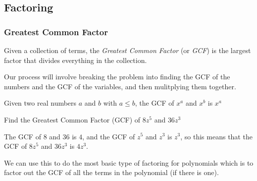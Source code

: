 \subsection{Factoring}

\subsubsection{Greatest Common Factor}

\begin{definition}\label{def: GCF}
Given a collection of terms, the \emph{Greatest Common Factor} (or \emph{GCF}) is the largest factor
that divides everything in the collection.
\end{definition}

Our process will involve breaking the problem into finding the GCF of the numbers and
the GCF of the variables, and then mulitplying them together.
\vspace{1em}

\begin{fact}
Given two real numbers $a$ and $b$ with $a\leq b$, the GCF of $x^a$ and $x^b$ is \ifprintanswers \underline{$x^a$}
\else \underline{\phantom{========}}\fi
\end{fact}

\ifprintanswers\else\newpage\fi

\begin{exercise}
Find the Greatest Common Factor (GCF) of $8z^5$ and $36z^3$
\end{exercise}
\begin{solution}[2in]
The GCF of $8$ and $36$ is \underline{\phantom{=}$4$\phantom{=}}, and the GCF of $z^5$ and $z^3$
is $z^3$, so this means that the GCF of $8z^5$ and $36z^3$ is $4z^3$.

\end{solution}
\vspace{0.5em}

We can use this to do the most basic type of factoring for polynomials which is to factor out
the GCF of all the terms in the polynomial (if there is one).

